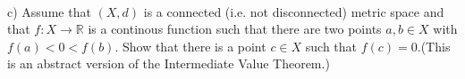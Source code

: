 \documentclass[12pt,letterpaper]{article}
\begin{document}
\noindent \\
c) Assume that $(X,d)$ is a connected (i.e. not disconnected) metric space and that $f : X \to \mathbb{R}$ is a continous function such that there are two points $a,b \in X$ with $f(a)<0<f(b)$. Show that there is a point $c\in X$ such that $f(c)=0$.(This is an abstract version of the Intermediate Value Theorem.)
\end{document}
